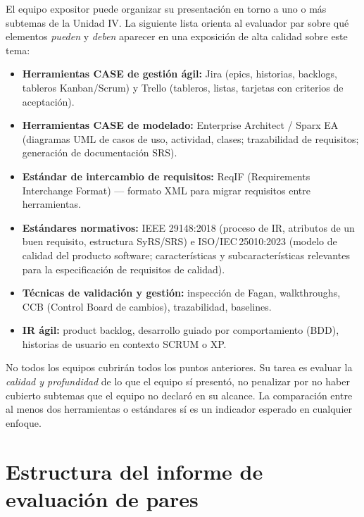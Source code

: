 \documentclass[11pt]{article}
\begin{document}
El equipo expositor puede organizar su presentación en torno a uno o más subtemas de la Unidad IV. La siguiente lista orienta al evaluador par sobre qué elementos \emph{pueden} y \emph{deben} aparecer en una exposición de alta calidad sobre este tema:

\begin{itemize}[leftmargin=16pt,itemsep=3pt]
	\item \textbf{Herramientas CASE de gestión ágil:} Jira (epics, historias, backlogs, tableros Kanban/\allowbreak{}Scrum) y Trello (tableros, listas, tarjetas con criterios de aceptación).
	\item \textbf{Herramientas CASE de modelado:} Enterprise Architect /\allowbreak{} Sparx EA (diagramas UML de casos de uso, actividad, clases; trazabilidad de requisitos; generación de documentación SRS).
	\item \textbf{Estándar de intercambio de requisitos:} ReqIF (Requirements Interchange Format) --- formato XML para migrar requisitos entre herramientas.
	\item \textbf{Estándares normativos:} IEEE 29148:2018 (proceso de IR, atributos de un buen requisito, estructura SyRS/\allowbreak{}SRS) e ISO/IEC\,25010:2023 (modelo de calidad del producto software; características y subcaracterísticas relevantes para la especificación de requisitos de calidad).
	\item \textbf{Técnicas de validación y gestión:} inspección de Fagan, walkthroughs, CCB (Control Board de cambios), trazabilidad, baselines.
	\item \textbf{IR ágil:} product backlog, desarrollo guiado por comportamiento (BDD), historias de usuario en contexto SCRUM o XP.
\end{itemize}

\begin{cajaaviso}[title=Para el evaluador par]
	No todos los equipos cubrirán todos los puntos anteriores. Su tarea es evaluar la \emph{calidad y profundidad} de lo que el equipo sí presentó, no penalizar por no haber cubierto subtemas que el equipo no declaró en su alcance. La comparación entre al menos dos herramientas o estándares sí es un indicador esperado en cualquier enfoque.
\end{cajaaviso}

\section{\textcolor{utegreendk}{Estructura del informe de evaluación de pares}}
\end{document}
